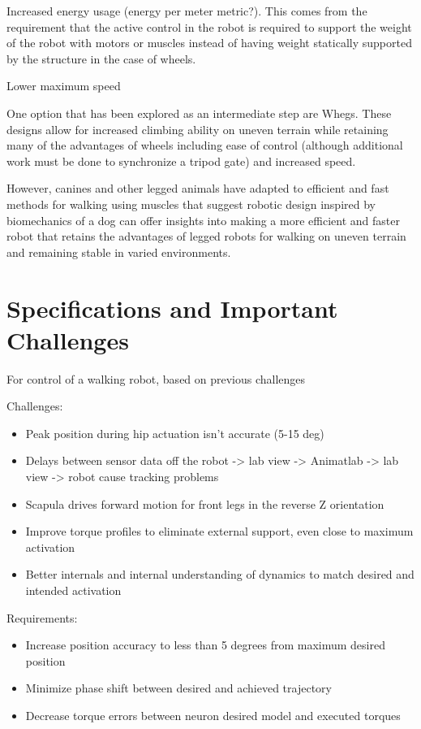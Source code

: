 Increased energy usage (energy per meter metric?). This comes from the
requirement that the active control in the robot is required to support the
weight of the robot with motors or muscles instead of having weight statically
supported by the structure in the case of wheels.

Lower maximum speed


One option that has been explored as an intermediate step are Whegs. These
designs allow for increased climbing ability on uneven terrain while retaining
many of the advantages of wheels including ease of control (although additional
work must be done to synchronize a tripod gate) and increased speed.


However, canines and other legged animals have adapted to efficient and fast 
methods for walking using muscles that suggest robotic design inspired by 
biomechanics of a dog can offer insights into making a more efficient and 
faster robot that retains the advantages of legged robots for walking on uneven
terrain and remaining stable in varied environments.

\section{Specifications and Important Challenges}

For control of a walking robot, based on previous challenges

Challenges:
\begin{itemize}
\item Peak position during hip actuation isn't accurate (5-15 deg) 
\item Delays between sensor data off the robot -> lab view -> Animatlab -> lab
view -> robot cause tracking problems
\item Scapula drives forward motion for front legs in the reverse Z orientation
\item Improve torque profiles to eliminate external support, even close to
maximum activation
\item Better internals and internal understanding of dynamics to match desired
and intended activation
\end{itemize}

Requirements:
\begin{itemize}
\item Increase position accuracy to less than 5 degrees from maximum desired position
\item Minimize phase shift between desired and achieved trajectory
\item Decrease torque errors between neuron desired model and executed torques
\end{itemize}

